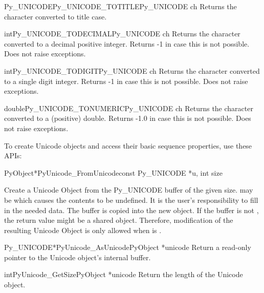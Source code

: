 \documentclass{manual}
\begin{document}
\begin{cfuncdesc}{Py_UNICODE}{Py_UNICODE_TOTITLE}{Py_UNICODE ch}
Returns the character  converted to title case.
\end{cfuncdesc}

\begin{cfuncdesc}{int}{Py_UNICODE_TODECIMAL}{Py_UNICODE ch}
Returns the character  converted to a decimal positive integer.
Returns -1 in case this is not possible. Does not raise exceptions.
\end{cfuncdesc}

\begin{cfuncdesc}{int}{Py_UNICODE_TODIGIT}{Py_UNICODE ch}
Returns the character  converted to a single digit integer.
Returns -1 in case this is not possible. Does not raise exceptions.
\end{cfuncdesc}

\begin{cfuncdesc}{double}{Py_UNICODE_TONUMERIC}{Py_UNICODE ch}
Returns the character  converted to a (positive) double.
Returns -1.0 in case this is not possible. Does not raise exceptions.
\end{cfuncdesc}


To create Unicode objects and access their basic sequence properties,
use these APIs:

\begin{cfuncdesc}{PyObject*}{PyUnicode_FromUnicode}{const Py_UNICODE *u,
                                                    int size} 

Create a Unicode Object from the Py_UNICODE buffer  of the
given size.  may be \NULL{} which causes the contents to be
undefined. It is the user's responsibility to fill in the needed data.
The buffer is copied into the new object. If the buffer is not \NULL{},
the return value might be a shared object. Therefore, modification of
the resulting Unicode Object is only allowed when  is \NULL{}.
\end{cfuncdesc}

\begin{cfuncdesc}{Py_UNICODE*}{PyUnicode_AsUnicode}{PyObject *unicode}
Return a read-only pointer to the Unicode object's internal
 buffer.
\end{cfuncdesc}

\begin{cfuncdesc}{int}{PyUnicode_GetSize}{PyObject *unicode}
Return the length of the Unicode object.
\end{cfuncdesc}
\end{document}
